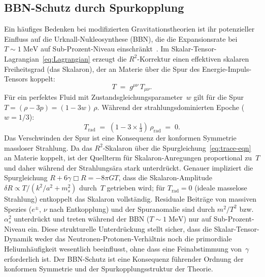 \documentclass[12pt,a4paper]{article}
\theoremstyle{definition}
\theoremstyle{plain}
\theoremstyle{remark}
\begin{document}
\subsection{BBN-Schutz durch Spurkopplung}\label{sec:BBN}

Ein h\"aufiges Bedenken bei modifizierten Gravitationstheorien ist ihr
potenzieller Einfluss auf die Urknall-Nukleosynthese (BBN), die die
Expansionsrate bei $T \sim 1\;\mathrm{MeV}$ auf Sub-Prozent-Niveau
einschr\"ankt~\cite{SotiriouFaraoni2010}. Im
Skalar-Tensor-Lagrangian~\eqref{eq:Lagrangian} erzeugt die
$R^{2}$-Korrektur einen effektiven skalaren Freiheitsgrad (das
Skalaron), der an Materie \"uber die Spur des
Energie-Impuls-Tensors koppelt:
\begin{equation}\label{eq:trace}
  T \;=\; g^{\mu\nu}\,T_{\mu\nu}.
\end{equation}
F\"ur ein perfektes Fluid mit Zustandsgleichungsparameter~$w$ gilt f\"ur die
Spur $T = (\rho - 3p) = (1 - 3w)\,\rho$. W\"ahrend der
strahlungsdominierten Epoche ($w = 1/3$):
\begin{equation}\label{eq:trace-rad}
  T_{\mathrm{rad}} \;=\; (1 - 3 \times \tfrac{1}{3})\,\rho_{\mathrm{rad}}
  \;=\; 0.
\end{equation}
Das Verschwinden der Spur ist eine Konsequenz der konformen Symmetrie
massloser Strahlung. Da das $R^{2}$-Skalaron \"uber die
Spurgleichung~\eqref{eq:trace-eqn} an Materie koppelt, ist der
Quellterm f\"ur Skalaron-Anregungen proportional zu~$T$ und daher
w\"ahrend der Strahlungs\"ara stark unterdr\"uckt. Genauer impliziert
die Spurgleichung $R + 6\gamma\Box R = -8\pi GT$, dass die
Skalaron-Amplitude $\delta R \propto T/(k^2/a^2 + m_s^2)$ durch~$T$
getrieben wird; f\"ur $T_{\mathrm{rad}} = 0$ (ideale masselose
Strahlung) entkoppelt das Skalaron vollst\"andig. Residuale
Beitr\"age von massiven Spezies ($e^{\pm}$, $\nu$ nach Entkopplung)
und der Spuranomalie sind durch $m^2/T^2$ bzw.\ $\alpha_s^2$
unterdr\"uckt und treten w\"ahrend der BBN ($T \sim 1\;\mathrm{MeV}$)
nur auf Sub-Prozent-Niveau ein.
Diese strukturelle Unterdr\"uckung stellt sicher, dass die
Skalar-Tensor-Dynamik weder das Neutronen-Protonen-Verh\"altnis noch
die primordiale Heliumh\"aufigkeit wesentlich beeinflusst, ohne dass
eine Feinabstimmung von~$\gamma$ erforderlich ist. Der BBN-Schutz
ist eine Konsequenz f\"uhrender Ordnung der konformen Symmetrie und der
Spurkopplungsstruktur der Theorie.
\end{document}
